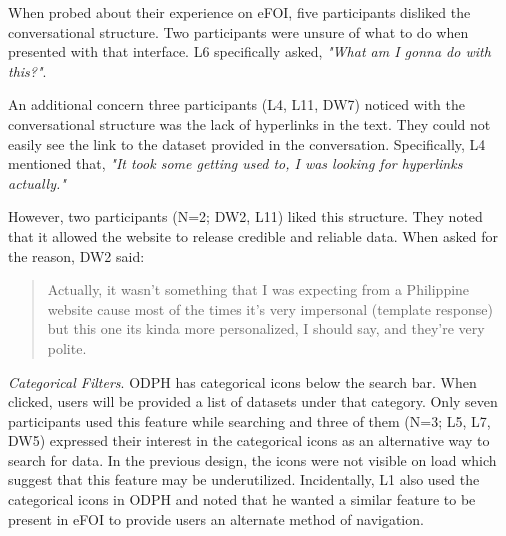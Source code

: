 \documentclass{sigchi}
\begin{document}
When probed about their experience on eFOI, five participants disliked the conversational structure. Two participants were unsure of what to do when presented with that interface. L6 specifically asked, \textit{"What am I gonna do with this?"}. 


An additional concern three participants (L4, L11, DW7) noticed with the conversational structure was the lack of hyperlinks in the text. They could not easily see the link to the dataset provided in the conversation. Specifically, L4 mentioned that, \textit{"It took some getting used to, I was looking for hyperlinks actually."}


However, two participants (N=2; DW2, L11) liked this structure. They noted that it allowed the website to release credible and reliable data. When asked for the reason, DW2 said:
\begin{quote}
  Actually, it wasn't something that I was expecting from a Philippine website cause most of the times it's very impersonal (template response) but this one its kinda more personalized, I should say, and they're very polite.
\end{quote}

\textit{Categorical Filters}. ODPH has categorical icons below the search bar. When clicked, users will be provided a list of datasets under that category. Only seven participants used this feature while searching and three of them (N=3; L5, L7, DW5) expressed their interest in the categorical icons as an alternative way to search for data. In the previous design, the icons were not visible on load which suggest that this feature may be underutilized. Incidentally, L1 also used the categorical icons in ODPH and noted that he wanted a similar feature to be present in eFOI to provide users an alternate method of navigation.
\end{document}
